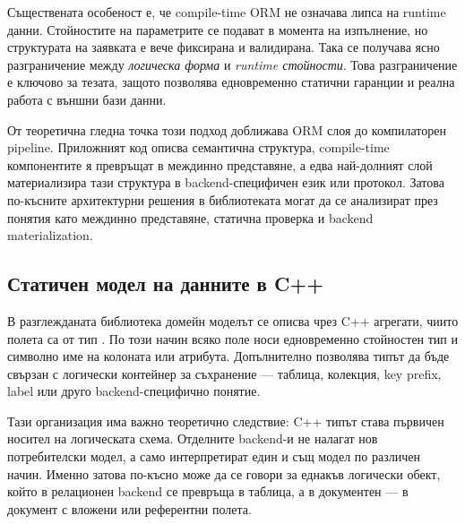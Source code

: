 Съществената особеност е, че compile-time ORM не означава липса на runtime данни. Стойностите на параметрите се подават в момента на изпълнение, но структурата на заявката е вече фиксирана и валидирана. Така се получава ясно разграничение между \emph{логическа форма} и \emph{runtime стойности}. Това разграничение е ключово за тезата, защото позволява едновременно статични гаранции и реална работа с външни бази данни.

От теоретична гледна точка този подход доближава ORM слоя до компилаторен pipeline. Приложният код описва семантична структура, compile-time компонентите я превръщат в междинно представяне, а едва най-долният слой материализира тази структура в backend-специфичен език или протокол. Затова по-късните архитектурни решения в библиотеката могат да се анализират през понятия като междинно представяне, статична проверка и backend materialization.

\subsection{Статичен модел на данните в C++}

В разглежданата библиотека домейн моделът се описва чрез C++ агрегати, чиито полета са от тип . По този начин всяко поле носи едновременно стойностен тип и символно име на колоната или атрибута. Допълнително  позволява типът да бъде свързан с логически контейнер за съхранение --- таблица, колекция, key prefix, label или друго backend-специфично понятие.

Тази организация има важно теоретично следствие: C++ типът става първичен носител на логическата схема. Отделните backend-и не налагат нов потребителски модел, а само интерпретират един и същ модел по различен начин. Именно затова по-късно може да се говори за еднакъв логически обект, който в релационен backend се превръща в таблица, а в документен --- в документ с вложени или референтни полета.

